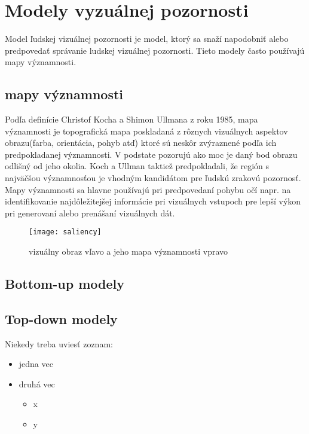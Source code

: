 \documentclass[10pt,twoside,slovak,a4paper]{article}
\begin{document}
\section{Modely vyzuálnej pozornosti} \label{1modely}
Model ľudskej vizuálnej pozornosti je model, ktorý sa snaží napodobniť alebo predpovedať správanie ludskej vizuálnej pozornosti. Tieto modely často používajú mapy významnosti.%
\subsection{mapy významnosti} \label{mapy}
Podľa definície Christof Kocha a Shimon Ullmana z roku 1985, mapa významnosti je topografická mapa poskladaná z rôznych vizuálnych aspektov obrazu(farba, orientácia, pohyb atď) ktoré sú neskôr zvýraznené podľa ich predpokladanej významnosti. V podstate pozorujú ako moc je daný bod obrazu odlišný od jeho okolia. Koch a Ullman taktiež predpokladali, že región s najväčšou významnosťou je vhodným kandidátom pre ľudskú zrakovú pozornosť. Mapy významnosti sa hlavne používajú pri predpovedaní pohybu očí napr. na identifikovanie najdôležitejšej informácie pri vizuálnych vstupoch pre lepší výkon pri generovaní alebo prenášaní vizuálnych dát.

\begin{figure*}[tbh]
\centering
\texttt{[image: saliency]}
\caption{vizuálny obraz vľavo a jeho mapa významnosti vpravo}
\label{f:rozhod}
\end{figure*}


\subsection{Bottom-up modely} \label{bot}



\subsection{Top-down modely} \label{top}

Niekedy treba uviesť zoznam:

\begin{itemize}
\item jedna vec
\item druhá vec
	\begin{itemize}
	\item x
	\item y
	\end{itemize}
\end{itemize}
\end{document}
